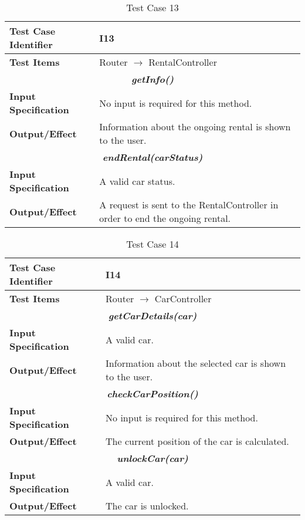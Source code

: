 \begin{table}[H]
	\begin{tabularx}{\textwidth}{l X}
		\hline
		\textbf{Test Case Identifier}	&	I13\\	\hline
		\textbf{Test Items}			&	Router $\rightarrow$ RentalController \\	\hline\hline
		\multicolumn{2}{c}{\textbf{\textit{getInfo()}}}	\\	\hline
			\textbf{Input Specification}	&	No input is required for this method.\\	\hline
			\textbf{Output/Effect}	&	Information about the ongoing rental is shown to the user.\\	\hline\hline
		\multicolumn{2}{c}{\textbf{\textit{endRental(carStatus)}}}	\\	\hline
			\textbf{Input Specification}	&	A valid car status.\\	\hline
			\textbf{Output/Effect}	&	A request is sent to the RentalController in order to end the ongoing rental.\\	\hline
	\end{tabularx}
	\captionsetup{textformat=empty,labelformat=blank}
	\caption{Test Case 13}
	\label{table:template-table-13}
\end{table}

\begin{table}[H]
	\begin{tabularx}{\textwidth}{l X}
		\hline
		\textbf{Test Case Identifier}	&	I14\\	\hline
		\textbf{Test Items}			&	Router $\rightarrow$ CarController \\	\hline\hline
		\multicolumn{2}{c}{\textbf{\textit{getCarDetails(car)}}}	\\	\hline
			\textbf{Input Specification}	&	A valid car.\\	\hline
			\textbf{Output/Effect}	&	Information about the selected car is shown to the user.\\	\hline\hline
		\multicolumn{2}{c}{\textbf{\textit{checkCarPosition()}}}	\\	\hline
			\textbf{Input Specification}	&	No input is required for this method.\\	\hline
			\textbf{Output/Effect}	&	The current position of the car is calculated.\\	\hline\hline
		\multicolumn{2}{c}{\textbf{\textit{unlockCar(car)}}}	\\	\hline
			\textbf{Input Specification}	&	A valid car.\\	\hline
			\textbf{Output/Effect}	&	The car is unlocked.\\	\hline
	\end{tabularx}
	\captionsetup{textformat=empty,labelformat=blank}
	\caption{Test Case 14}
	\label{table:template-table-14}
\end{table}

